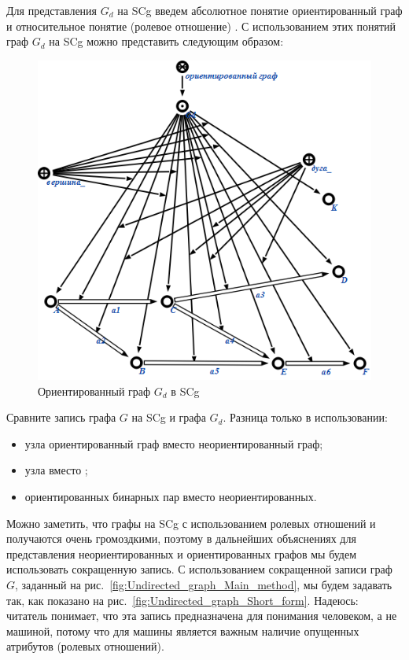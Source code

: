 Для представления $G_d$ на SCg введем абсолютное понятие
ориентированный граф и относительное понятие (ролевое отношение)
. С использованием этих понятий граф $G_d$ на SCg можно
представить следующим образом:

\begin{figure}[h]
  \centering
  \includegraphics[scale=0.6]{images/2/Directed_graph}
  \caption{Ориентированный граф $G_d$ в SCg}
  \label{fig:Directed_graph}
\end{figure}

Сравните запись графа $G$ на SCg и графа $G_d$. Разница только в
использовании:

\begin{itemize}
\item узла ориентированный граф вместо неориентированный граф;
\item узла  вместо ;
\item ориентированных бинарных пар вместо неориентированных.
\end{itemize}

Можно заметить, что графы на SCg с использованием ролевых отношений
 и  получаются очень громоздкими, поэтому в
дальнейших объяснениях для представления неориентированных и
ориентированных графов мы будем использовать сокращенную запись. С
использованием сокращенной записи граф $G$, заданный на
рис.~\ref{fig:Undirected_graph_Main_method}, мы будем задавать так,
как показано на рис.~\ref{fig:Undirected_graph_Short_form}. Надеюсь:
читатель понимает, что эта запись предназначена для понимания
человеком, а не машиной, потому что для машины является важным наличие
опущенных атрибутов (ролевых отношений).

